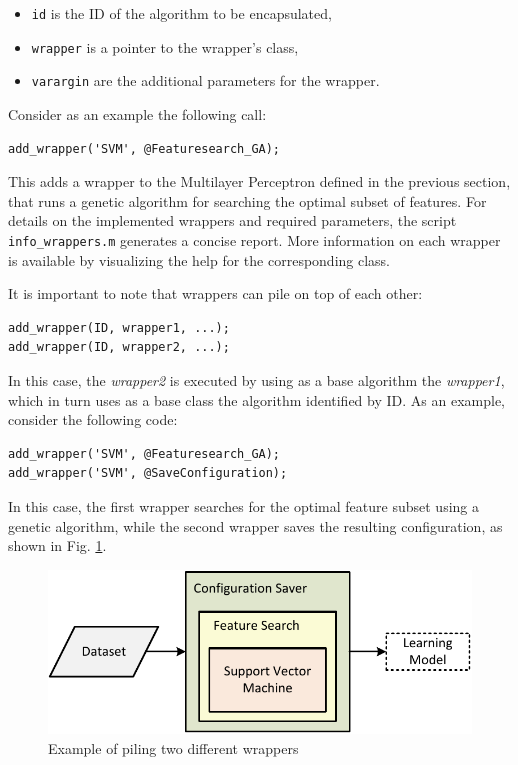 \begin{itemize}
\item \verb|id| is the ID of the algorithm to be encapsulated,
\item \verb|wrapper| is a pointer to the wrapper’s class,
\item \verb|varargin| are the additional parameters for the wrapper.
\end{itemize}

\noindent Consider as an example the following call:
\begin{lstlisting}
add_wrapper('SVM', @Featuresearch_GA);
\end{lstlisting}

\noindent This adds a wrapper to the Multilayer Perceptron defined in the previous section, that runs a genetic algorithm for searching the optimal subset of features. For details on the implemented wrappers and required parameters, the script \verb|info_wrappers.m| generates a concise report. More information on each wrapper is available by visualizing the help for the corresponding class.

It is important to note that wrappers can pile on top of each other:

\begin{lstlisting}
add_wrapper(ID, wrapper1, ...);
add_wrapper(ID, wrapper2, ...);
\end{lstlisting}

In this case, the \textit{wrapper2} is executed by using as a base algorithm the \textit{wrapper1}, which in turn uses as a base class the algorithm identified by ID. As an example, consider the following code:

\begin{lstlisting}
add_wrapper('SVM', @Featuresearch_GA);
add_wrapper('SVM', @SaveConfiguration);
\end{lstlisting}

\noindent In this case, the first wrapper searches for the optimal feature subset using a genetic algorithm, while the second wrapper saves the resulting configuration, as shown in Fig. \ref{fig:wrappersexample}.

\begin{figure}[t]
\centering
\includegraphics[scale=0.6]{./images/WrappersExample}
\caption{Example of piling two different wrappers}
\label{fig:wrappersexample}
\end{figure}


